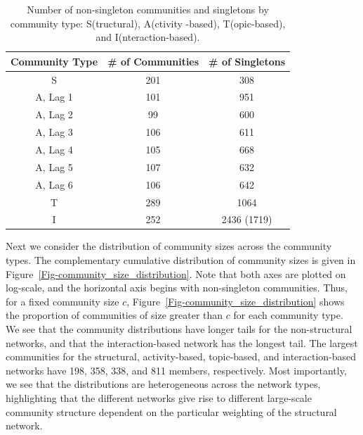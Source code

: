 \begin{table}[ht]
	\caption{Number of non-singleton communities and singletons by community type: S(tructural), A(ctivity -based), T(opic-based), and I(nteraction-based).}
	\centering
	\begin{tabular}{| c | c | c |}
		\hline Community Type & \# of Communities & \# of Singletons \\ \hline
		S & 201 & 308 \\
		A, Lag 1 & 101 & 951 \\
		A, Lag 2 & 99 & 600 \\
		A, Lag 3 & 106 & 611 \\
		A, Lag 4 & 105 & 668 \\
		A, Lag 5 & 107 & 632 \\
		A, Lag 6 & 106 & 642 \\
		T & 289 & 1064 \\
		I & 252 & 2436 (1719) \\ \hline
	\end{tabular}
	\label{Table-comm_count}
\end{table}

Next we consider the distribution of community sizes across the community types. The complementary cumulative distribution of community sizes is given in Figure~\ref{Fig-community_size_distribution}. Note that both axes are plotted on log-scale, and the horizontal axis begins with non-singleton communities. Thus, for a fixed community size $c$, Figure~\ref{Fig-community_size_distribution} shows the proportion of communities of size greater than $c$ for each community type. We see that the community distributions have longer tails for the non-structural networks, and that the interaction-based network has the longest tail. The largest communities for the structural, activity-based, topic-based, and interaction-based networks have 198, 358, 338, and 811 members, respectively. Most importantly, we see that the distributions are heterogeneous across the network types, highlighting that the different networks give rise to different large-scale community structure dependent on the particular weighting of the structural network.

